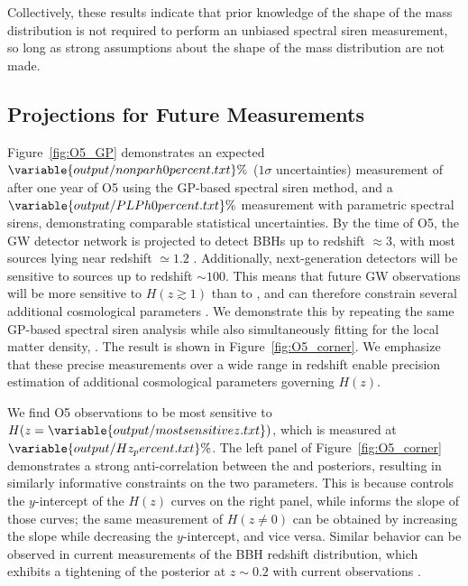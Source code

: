 \documentclass[preprint2,linenumbers]{aastex631}
\begin{document}
Collectively, these results indicate that prior knowledge of the shape of the mass distribution is not required to perform an unbiased spectral siren measurement, so long as strong assumptions about the shape of the mass distribution are not made.

\subsection{Projections for Future Measurements}
Figure~\ref{fig:O5_GP} demonstrates an expected $\variable{output/nonparh0percent.txt}\%$ ($1\sigma$ uncertainties) measurement of \Ho{} after one year of \ac{O5} using the \ac{GP}-based spectral siren method, and a $\variable{output/PLPh0percent.txt}\%$ measurement with parametric spectral sirens, demonstrating comparable statistical uncertainties.
By the time of \ac{O5}, the \ac{GW} detector network is projected to detect \acp{BBH} up to redshift $\approx 3$, with most sources lying near redshift $\simeq 1.2$ \citep{chen_distance_2021}.
Additionally, next-generation detectors will be sensitive to sources up to redshift $\sim 100$.
This means that future \ac{GW} observations will be more sensitive to $H(z\gtrsim1)$ than to \Ho, and can therefore constrain several additional cosmological parameters \citep{Chen:2024gdn}.
We demonstrate this by repeating the same \ac{GP}-based spectral siren analysis while also simultaneously fitting for the local matter density, \Omm.
The result is shown in Figure~\ref{fig:O5_corner}.
We emphasize that these precise measurements over a wide range in redshift enable precision estimation of additional cosmological parameters governing $H(z)$.

We find \ac{O5} observations to be most sensitive to $H(z=\variable{output/mostsensitivez.txt})$, which is measured at $\variable{output/Hz_percent.txt}\%$.
The left panel of Figure~\ref{fig:O5_corner} demonstrates a strong anti-correlation between the \Omm{} and \Ho{} posteriors, resulting in similarly informative constraints on the two parameters.
This is because \Ho{} controls the $y$-intercept of the $H(z)$ curves on the right panel, while \Omm{} informs the slope of those curves; the same measurement of $H(z\neq0)$ can be obtained by increasing the slope while decreasing the $y$-intercept, and vice versa.
Similar behavior can be observed in current measurements of the \ac{BBH} redshift distribution, which exhibits a tightening of the posterior at $z\sim0.2$ with current observations \citep{abbott_population_2023, callister_parameter-free_2023}.
\end{document}
